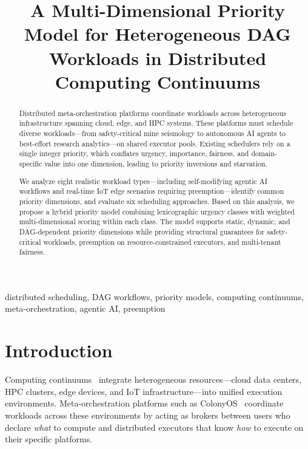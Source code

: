 \documentclass[conference]{IEEEtran}
\begin{document}
\title{A Multi-Dimensional Priority Model for Heterogeneous DAG Workloads in Distributed Computing Continuums}

\author{
}

\maketitle

\begin{abstract}
Distributed meta-orchestration platforms coordinate workloads across heterogeneous infrastructure spanning cloud, edge, and HPC systems. These platforms must schedule diverse workloads---from safety-critical mine seismology to autonomous AI agents to best-effort research analytics---on shared executor pools. Existing schedulers rely on a single integer priority, which conflates urgency, importance, fairness, and domain-specific value into one dimension, leading to priority inversions and starvation.

We analyze eight realistic workload types---including self-modifying agentic AI workflows and real-time IoT edge scenarios requiring preemption---identify common priority dimensions, and evaluate six scheduling approaches. Based on this analysis, we propose a hybrid priority model combining lexicographic urgency classes with weighted multi-dimensional scoring within each class. The model supports static, dynamic, and DAG-dependent priority dimensions while providing structural guarantees for safety-critical workloads, preemption on resource-constrained executors, and multi-tenant fairness.
\end{abstract}

\begin{IEEEkeywords}
distributed scheduling, DAG workflows, priority models, computing continuums, meta-orchestration, agentic AI, preemption
\end{IEEEkeywords}

\section{Introduction}
\label{sec:introduction}

Computing continuums~\cite{dustdar2023computing} integrate heterogeneous resources---cloud data centers, HPC clusters, edge devices, and IoT infrastructure---into unified execution environments. Meta-orchestration platforms such as ColonyOS~\cite{colonyos} coordinate workloads across these environments by acting as brokers between users who declare \emph{what} to compute and distributed executors that know \emph{how} to execute on their specific platforms.
\end{document}
